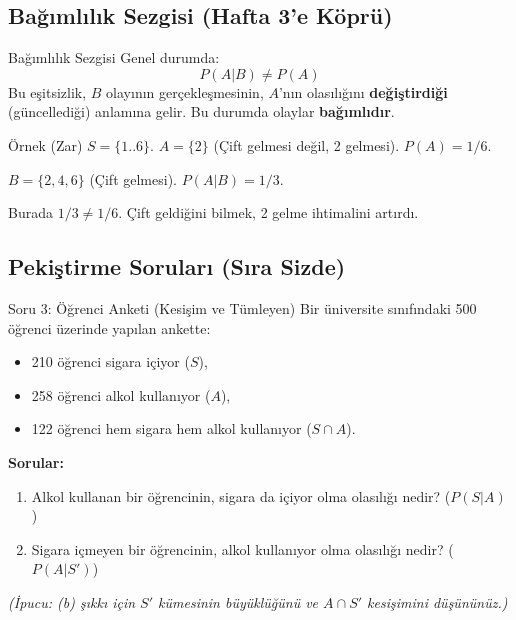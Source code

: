\documentclass[light]{lutbeamer}
\begin{document}
\subsection{Bağımlılık Sezgisi (Hafta 3'e Köprü)}
\begin{frame}[fragile]{Bağımlılık Sezgisi}
    Genel durumda:
    \[ P(A|B) \neq P(A) \]
    Bu eşitsizlik, $B$ olayının gerçekleşmesinin, $A$'nın olasılığını \textbf{değiştirdiği} (güncellediği) anlamına gelir. Bu durumda olaylar \textbf{bağımlıdır}.

    \vspace{0.3cm}
    \begin{exampleblock}{Örnek (Zar)}
        $S=\{1..6\}$. $A=\{2\}$ (Çift gelmesi değil, 2 gelmesi). $P(A)=1/6$.
        
        $B=\{2,4,6\}$ (Çift gelmesi). $P(A|B) = 1/3$.
        
        Burada $1/3 \neq 1/6$. Çift geldiğini bilmek, 2 gelme ihtimalini artırdı.
    \end{exampleblock}

\end{frame}

\subsection{Pekiştirme Soruları (Sıra Sizde)}

\begin{frame}{Soru 3: Öğrenci Anketi (Kesişim ve Tümleyen)}
    Bir üniversite sınıfındaki 500 öğrenci üzerinde yapılan ankette:
    \begin{itemize}
        \item 210 öğrenci sigara içiyor ($S$),
        \item 258 öğrenci alkol kullanıyor ($A$),
        \item 122 öğrenci hem sigara hem alkol kullanıyor ($S \cap A$).
    \end{itemize}
    
    \vspace{0.2cm}
    \textbf{Sorular:}
    \begin{enumerate}
        \item[(a)] Alkol kullanan bir öğrencinin, sigara da içiyor olma olasılığı nedir? ($P(S|A)$)
        \item[(b)] Sigara içmeyen bir öğrencinin, alkol kullanıyor olma olasılığı nedir? ($P(A|S')$)
    \end{enumerate}
    
    \vspace{0.1cm}
    \textit{(İpucu: (b) şıkkı için $S'$ kümesinin büyüklüğünü ve $A \cap S'$ kesişimini düşününüz.)}
\end{frame}
\end{document}
